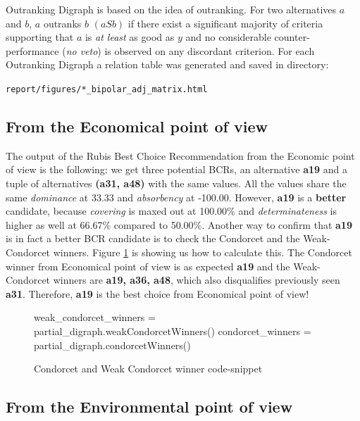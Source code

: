\documentclass[a4paper]{article}
\begin{document}
Outranking Digraph is based on the idea of outranking. For two alternatives $a$ and $b$, $a$ outranks $b$ $(a S b)$ if there exist a significant majority of criteria supporting that $a$ is \emph{at least} as good as $y$ and no considerable counter-performance (\emph{no veto}) is observed on any discordant criterion. For each Outranking Digraph a relation table was generated and saved in directory:

\texttt{report/figures/*\_bipolar\_adj\_matrix.html} 

\subsection{From the Economical point of view}

The output of the Rubis Best Choice Recommendation from the Economic point of view is the following: we get three potential BCRs, an alternative \textbf{a19} and a tuple of alternatives \textbf{(a31, a48)} with the same values. All the values share the same \emph{dominance} at 33.33 and \emph{absorbency} at -100.00. However, \textbf{a19} is a \textbf{better} candidate, because \emph{covering} is maxed out at 100.00\% and \emph{determinateness} is higher as well at 66.67\% compared to 50.00\%. Another way to confirm that \textbf{a19} is in fact a better BCR candidate is to check the Condorcet and the Weak-Condorcet winners. Figure \ref{lst:condo} is showing us how to calculate this. The Condorcet winner from Economical point of view is as expected \textbf{a19} and the Weak-Condorcet winners are \textbf{a19, a36, a48}, which also disqualifies previously seen \textbf{a31}. Therefore, \textbf{a19} is the best choice from Economical point of view!

\begin{figure}[H]
	\begin{center}
		\begin{python}
weak_condorcet_winners = partial_digraph.weakCondorcetWinners()
condorcet_winners      = partial_digraph.condorcetWinners()
		\end{python}
	\end{center}
	\caption{Condorcet and Weak Condorcet winner code-snippet}
	\label{lst:condo}
\end{figure}



\subsection{From the Environmental point of view}
\label{sec:env}
\end{document}
